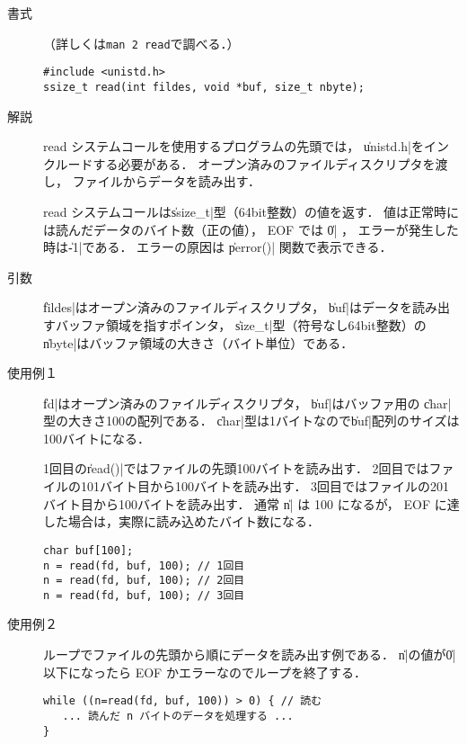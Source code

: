 \begin{description}
\item[書式]（詳しくは\texttt{man 2 read}で調べる．）

\begin{lstlisting}[numbers=none]
#include <unistd.h>
ssize_t read(int fildes, void *buf, size_t nbyte);
\end{lstlisting}

\item[解説]
read システムコールを使用するプログラムの先頭では，
\|unistd.h|をインクルードする必要がある．
オープン済みのファイルディスクリプタを渡し，
ファイルからデータを読み出す．

read システムコールは\|ssize_t|型（64bit整数）の値を返す．
値は正常時には読んだデータのバイト数（正の値），
EOF では \|0| ，
エラーが発生した時は\|-1|である．
エラーの原因は \|perror()| 関数で表示できる．

\item[引数]
\|fildes|はオープン済みのファイルディスクリプタ，
\|buf|はデータを読み出すバッファ領域を指すポインタ，
\|size_t|型（符号なし64bit整数）の
\|nbyte|はバッファ領域の大きさ（バイト単位）である．

\item[使用例１]
\|fd|はオープン済みのファイルディスクリプタ，
\|buf|はバッファ用の \|char| 型の大きさ100の配列である．
\|char|型は1バイトなので\|buf|配列のサイズは100バイトになる．

1回目の\|read()|ではファイルの先頭100バイトを読み出す．
2回目ではファイルの101バイト目から100バイトを読み出す．
3回目ではファイルの201バイト目から100バイトを読み出す．
通常 \|n| は 100 になるが，
EOF に達した場合は，実際に読み込めたバイト数になる．

\begin{lstlisting}[numbers=none]
char buf[100];
n = read(fd, buf, 100); // 1回目
n = read(fd, buf, 100); // 2回目
n = read(fd, buf, 100); // 3回目
\end{lstlisting}

\item[使用例２]
ループでファイルの先頭から順にデータを読み出す例である．
\|n|の値が\|0|以下になったら EOF かエラーなのでループを終了する．

\begin{lstlisting}[numbers=none]
while ((n=read(fd, buf, 100)) > 0) { // 読む
   ... 読んだ n バイトのデータを処理する ...
}
\end{lstlisting}
\end{description}


